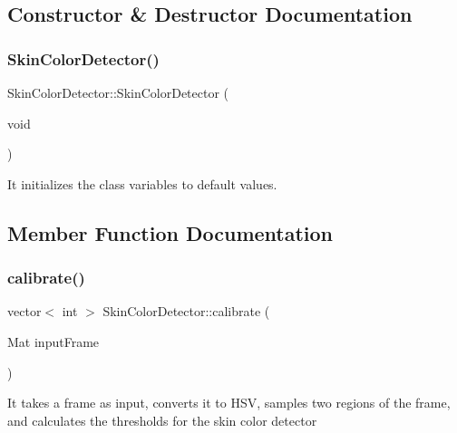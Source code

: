 \subsection{Constructor \& Destructor Documentation}
\mbox{\label{classGestureDetection_1_1SkinColorDetector_ab059f7f926aac46a712db749b4df4f27}} 
\subsubsection{\texorpdfstring{Skin\+Color\+Detector()}{SkinColorDetector()}}
{\footnotesize\ttfamily Skin\+Color\+Detector\+::\+Skin\+Color\+Detector (\begin{DoxyParamCaption}\item[{void}]{ }\end{DoxyParamCaption})}

It initializes the class variables to default values. 

\subsection{Member Function Documentation}
\mbox{\label{classGestureDetection_1_1SkinColorDetector_ae8b3880d1d75b07e356cd7d1ff128ed9}} 
\subsubsection{\texorpdfstring{calibrate()}{calibrate()}}
{\footnotesize\ttfamily vector$<$ int $>$ Skin\+Color\+Detector\+::calibrate (\begin{DoxyParamCaption}\item[{Mat}]{input\+Frame }\end{DoxyParamCaption})}

It takes a frame as input, converts it to H\+SV, samples two regions of the frame, and calculates the thresholds for the skin color detector


